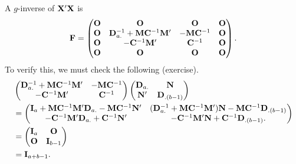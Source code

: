 A $ g $-inverse of $ \mathbf{X}'\mathbf{X} $ is
\[ \mathbf{F}=\begin{pmatrix}
        \mathbf{O} & \mathbf{O}                                                & \mathbf{O}                 & \mathbf{O} \\
        \mathbf{O} & \mathbf{D}_{a.}^{-1}+\mathbf{M}\mathbf{C}^{-1}\mathbf{M}' & -\mathbf{M}\mathbf{C}^{-1} & \mathbf{O} \\
        \mathbf{O} & -\mathbf{C}^{-1}\mathbf{M}'                               & \mathbf{C}^{-1}            & \mathbf{O} \\
        \mathbf{O} & \mathbf{O}                                                & \mathbf{O}                 & \mathbf{O} \\
    \end{pmatrix}. \]
To verify this, we must check the following (exercise).
\begin{align*}
     & \begin{pmatrix}
           \mathbf{D}_{a.}^{-1}+\mathbf{M}\mathbf{C}^{-1}\mathbf{M}' & -\mathbf{M}\mathbf{C}^{-1} \\
           -\mathbf{C}^{-1}\mathbf{M}'                               & \mathbf{C}^{-1}            \\
       \end{pmatrix}\begin{pmatrix}
                        \mathbf{D}_{a.} & \mathbf{N}          \\
                        \mathbf{N}'     & \mathbf{D}_{.(b-1)}
                    \end{pmatrix}                                                                                                                                        \\
     & =\begin{pmatrix}
            \mathbf{I}_a + \mathbf{M}\mathbf{C}^{-1}\mathbf{M}'\mathbf{D}_{a.}-\mathbf{M}\mathbf{C}^{-1}\mathbf{N}' & (\mathbf{D}_{a.}^{-1}+\mathbf{M}\mathbf{C}^{-1}\mathbf{M}')\mathbf{N}-\mathbf{M}\mathbf{C}^{-1}\mathbf{D}_{.(b-1)} \\
            -\mathbf{C}^{-1}\mathbf{M}'\mathbf{D}_{a.}+\mathbf{C}^{-1}\mathbf{N}'                                   & -\mathbf{C}^{-1}\mathbf{M}'\mathbf{N}+\mathbf{C}^{-1}\mathbf{D}_{.(b-1)}.
        \end{pmatrix} \\
     & =\begin{pmatrix}
            \mathbf{I}_a & \mathbf{O}       \\
            \mathbf{O}   & \mathbf{I}_{b-1}
        \end{pmatrix}                                                                                                                                                                                              \\
     & =\mathbf{I}_{a+b-1}.
\end{align*}